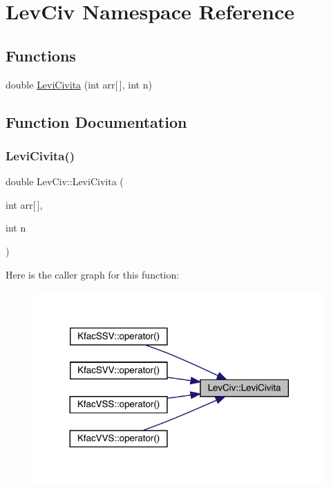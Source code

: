 \hypertarget{namespaceLevCiv}{}\section{Lev\+Civ Namespace Reference}
\label{namespaceLevCiv}
\subsection*{Functions}
\begin{DoxyCompactItemize}
\item 
double \mbox{\hyperlink{namespaceLevCiv_adf1ae0fe71d3a8851d6ec4bd21ef4907}{Levi\+Civita}} (int arr\mbox{[}$\,$\mbox{]}, int n)
\end{DoxyCompactItemize}


\subsection{Function Documentation}
\mbox{\label{namespaceLevCiv_adf1ae0fe71d3a8851d6ec4bd21ef4907}} 
\subsubsection{\texorpdfstring{LeviCivita()}{LeviCivita()}}
{\footnotesize\ttfamily double Lev\+Civ\+::\+Levi\+Civita (\begin{DoxyParamCaption}\item[{int}]{arr\mbox{[}$\,$\mbox{]},  }\item[{int}]{n }\end{DoxyParamCaption})}

Here is the caller graph for this function\+:\nopagebreak
\begin{figure}[H]
\begin{center}
\leavevmode
\includegraphics[width=317pt]{d3/df8/namespaceLevCiv_adf1ae0fe71d3a8851d6ec4bd21ef4907_icgraph}
\end{center}
\end{figure}
